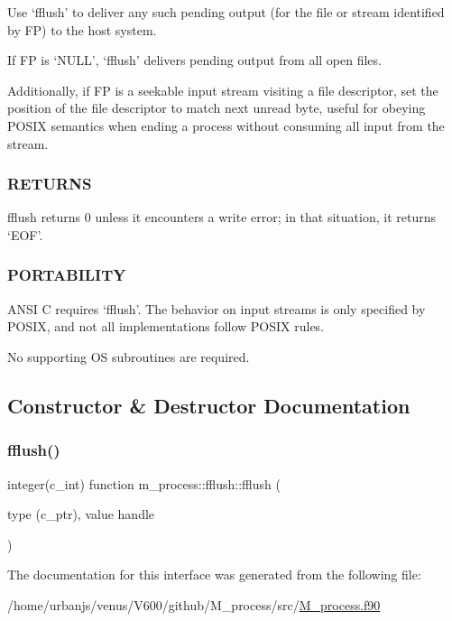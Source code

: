 Use `fflush' to deliver any such pending output (for the file or stream identified by FP) to the host system.

If FP is `N\+U\+LL', `fflush' delivers pending output from all open files.

Additionally, if FP is a seekable input stream visiting a file descriptor, set the position of the file descriptor to match next unread byte, useful for obeying P\+O\+S\+IX semantics when ending a process without consuming all input from the stream.

\subsubsection*{R\+E\+T\+U\+R\+NS}

fflush returns \textquotesingle{}0\textquotesingle{} unless it encounters a write error; in that situation, it returns `E\+OF'.

\subsubsection*{P\+O\+R\+T\+A\+B\+I\+L\+I\+TY}

A\+N\+SI C requires `fflush'. The behavior on input streams is only specified by P\+O\+S\+IX, and not all implementations follow P\+O\+S\+IX rules.

No supporting OS subroutines are required. 

\subsection{Constructor \& Destructor Documentation}
\mbox{\label{interfacem__process_1_1fflush_a77d0db933d548b3ee20b064e705a408e}} 
\subsubsection{\texorpdfstring{fflush()}{fflush()}}
{\footnotesize\ttfamily integer(c\+\_\+int) function m\+\_\+process\+::fflush\+::fflush (\begin{DoxyParamCaption}\item[{type (c\+\_\+ptr), value}]{handle }\end{DoxyParamCaption})\hspace{0.3cm}{\ttfamily [private]}}



The documentation for this interface was generated from the following file\+:\begin{DoxyCompactItemize}
\item 
/home/urbanjs/venus/\+V600/github/\+M\+\_\+process/src/\mbox{\hyperlink{M__process_8f90}{M\+\_\+process.\+f90}}\end{DoxyCompactItemize}
